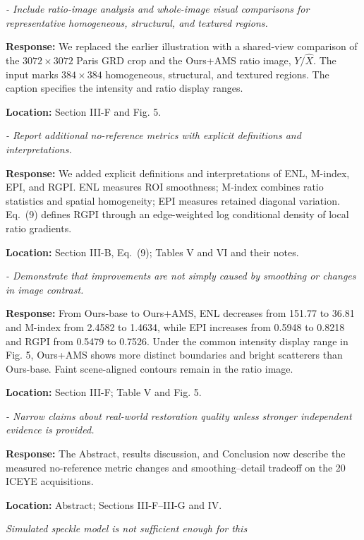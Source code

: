 \documentclass[11pt,letterpaper]{article}
\newcommand{\reviewgroup}[1]{%
  \Needspace{5\baselineskip}%
  \medskip\textit{#1}\par
}
\begin{document}
\textit{- Include ratio-image analysis and whole-image visual comparisons for representative homogeneous, structural, and textured regions.}

\textbf{Response:} We replaced the earlier illustration with a shared-view comparison of the \(3072\times3072\) Paris GRD crop and the Ours+AMS ratio image, \(Y/\widehat{X}\). The input marks \(384\times384\) homogeneous, structural, and textured regions. The caption specifies the intensity and ratio display ranges.

\textbf{Location:} Section III-F and Fig. 5.

\textit{- Report additional no-reference metrics with explicit definitions and interpretations.}

\textbf{Response:} We added explicit definitions and interpretations of ENL, M-index, EPI, and RGPI. ENL measures ROI smoothness; M-index combines ratio statistics and spatial homogeneity; EPI measures retained diagonal variation. Eq.~(9) defines RGPI through an edge-weighted log conditional density of local ratio gradients.

\textbf{Location:} Section III-B, Eq.~(9); Tables V and VI and their notes.

\textit{- Demonstrate that improvements are not simply caused by smoothing or changes in image contrast.}

\textbf{Response:} From Ours-base to Ours+AMS, ENL decreases from 151.77 to 36.81 and M-index from 2.4582 to 1.4634, while EPI increases from 0.5948 to 0.8218 and RGPI from 0.5479 to 0.7526. Under the common intensity display range in Fig. 5, Ours+AMS shows more distinct boundaries and bright scatterers than Ours-base. Faint scene-aligned contours remain in the ratio image.

\textbf{Location:} Section III-F; Table V and Fig. 5.

\textit{- Narrow claims about real-world restoration quality unless stronger independent evidence is provided.}

\textbf{Response:} The Abstract, results discussion, and Conclusion now describe the measured no-reference metric changes and smoothing--detail tradeoff on the 20 ICEYE acquisitions.

\textbf{Location:} Abstract; Sections III-F--III-G and IV.

\reviewgroup{Simulated speckle model is not sufficient enough for this}
\end{document}
